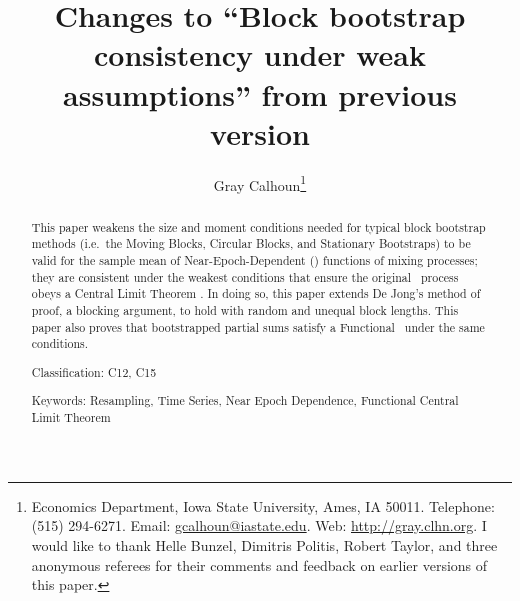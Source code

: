 \documentclass[11pt]{article}
\begin{document}
\author{Gray Calhoun\thanks{Economics Department, Iowa State
    University, Ames, IA 50011. Telephone: (515) 294-6271.  Email:
    \protect\url{gcalhoun@iastate.edu}. Web:
    \protect\url{http://gray.clhn.org}.  I would like to thank
    Helle Bunzel, Dimitris Politis, Robert Taylor, and three anonymous
    referees for their comments and feedback on earlier versions of
    this paper.}}

\title{Changes to ``Block bootstrap consistency under weak assumptions''
  from previous version}

\maketitle

\begin{abstract}\noindent
  This paper weakens the size and moment conditions needed for typical
  block bootstrap methods (i.e.\ the Moving Blocks, Circular Blocks,
  and Stationary Bootstraps) to be valid for the sample mean of
  Near-Epoch-Dependent (\ned) functions of mixing processes; they are
  consistent under the weakest conditions that ensure the original
  \ned\ process obeys a Central Limit Theorem \citep[those
    of][\textit{Econometric Theory}]{Jon:97}.  In doing so, this paper
  extends De Jong's method of proof, a blocking argument, to hold with
  random and unequal block lengths.  This paper also proves that
  bootstrapped partial sums satisfy a Functional \clt\ under the same
  conditions.

  \noindent {} Classification: C12, C15

  \noindent Keywords: Resampling, Time Series, Near Epoch Dependence,
  Functional Central Limit Theorem
\end{abstract}
\end{document}
